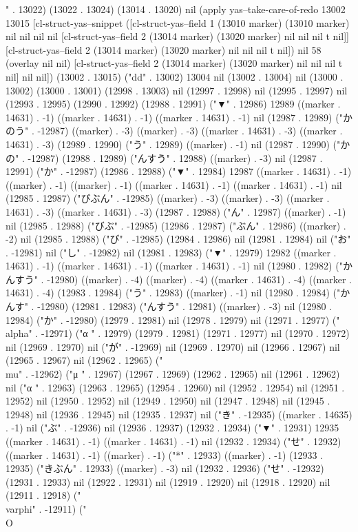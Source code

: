" . 13022) (13022 . 13024) (13014 . 13020) nil (apply yas--take-care-of-redo 13002 13015 [cl-struct-yas--snippet ([cl-struct-yas--field 1 (13010 marker) (13010 marker) nil nil nil nil [cl-struct-yas--field 2 (13014 marker) (13020 marker) nil nil nil t nil]] [cl-struct-yas--field 2 (13014 marker) (13020 marker) nil nil nil t nil]) nil 58 (overlay nil nil) [cl-struct-yas--field 2 (13014 marker) (13020 marker) nil nil nil t nil] nil nil]) (13002 . 13015) ("dd" . 13002) 13004 nil (13002 . 13004) nil (13000 . 13002) (13000 . 13001) (12998 . 13003) nil (12997 . 12998) nil (12995 . 12997) nil (12993 . 12995) (12990 . 12992) (12988 . 12991) ("▼" . 12986) 12989 ((marker . 14631) . -1) ((marker . 14631) . -1) ((marker . 14631) . -1) nil (12987 . 12989) ("かのう" . -12987) ((marker) . -3) ((marker) . -3) ((marker . 14631) . -3) ((marker . 14631) . -3) (12989 . 12990) ("う" . 12989) ((marker) . -1) nil (12987 . 12990) ("かの" . -12987) (12988 . 12989) ("んすう" . 12988) ((marker) . -3) nil (12987 . 12991) ("か" . -12987) (12986 . 12988) ("▼" . 12984) 12987 ((marker . 14631) . -1) ((marker) . -1) ((marker) . -1) ((marker . 14631) . -1) ((marker . 14631) . -1) nil (12985 . 12987) ("びぶん" . -12985) ((marker) . -3) ((marker) . -3) ((marker . 14631) . -3) ((marker . 14631) . -3) (12987 . 12988) ("ん" . 12987) ((marker) . -1) nil (12985 . 12988) ("びぶ" . -12985) (12986 . 12987) ("ぶん" . 12986) ((marker) . -2) nil (12985 . 12988) ("び" . -12985) (12984 . 12986) nil (12981 . 12984) nil ("お" . -12981) nil ("し" . -12982) nil (12981 . 12983) ("▼" . 12979) 12982 ((marker . 14631) . -1) ((marker . 14631) . -1) ((marker . 14631) . -1) nil (12980 . 12982) ("かんすう" . -12980) ((marker) . -4) ((marker) . -4) ((marker . 14631) . -4) ((marker . 14631) . -4) (12983 . 12984) ("う" . 12983) ((marker) . -1) nil (12980 . 12984) ("かんす" . -12980) (12981 . 12983) ("んすう" . 12981) ((marker) . -3) nil (12980 . 12984) ("か" . -12980) (12979 . 12981) nil (12978 . 12979) nil (12971 . 12977) ("\\alpha" . -12971) ("α
" . 12979) (12979 . 12981) (12971 . 12977) nil (12970 . 12972) nil (12969 . 12970) nil ("が" . -12969) nil (12969 . 12970) nil (12966 . 12967) nil (12965 . 12967) nil (12962 . 12965) ("\\mu" . -12962) ("μ
" . 12967) (12967 . 12969) (12962 . 12965) nil (12961 . 12962) nil ("α
" . 12963) (12963 . 12965) (12954 . 12960) nil (12952 . 12954) nil (12951 . 12952) nil (12950 . 12952) nil (12949 . 12950) nil (12947 . 12948) nil (12945 . 12948) nil (12936 . 12945) nil (12935 . 12937) nil ("き" . -12935) ((marker . 14635) . -1) nil ("ぶ" . -12936) nil (12936 . 12937) (12932 . 12934) ("▼" . 12931) 12935 ((marker . 14631) . -1) ((marker . 14631) . -1) nil (12932 . 12934) ("せ" . 12932) ((marker . 14631) . -1) ((marker) . -1) ("*" . 12933) ((marker) . -1) (12933 . 12935) ("きぶん" . 12933) ((marker) . -3) nil (12932 . 12936) ("せ" . -12932) (12931 . 12933) nil (12922 . 12931) nil (12919 . 12920) nil (12918 . 12920) nil (12911 . 12918) ("\\varphi" . -12911) ("\\O
